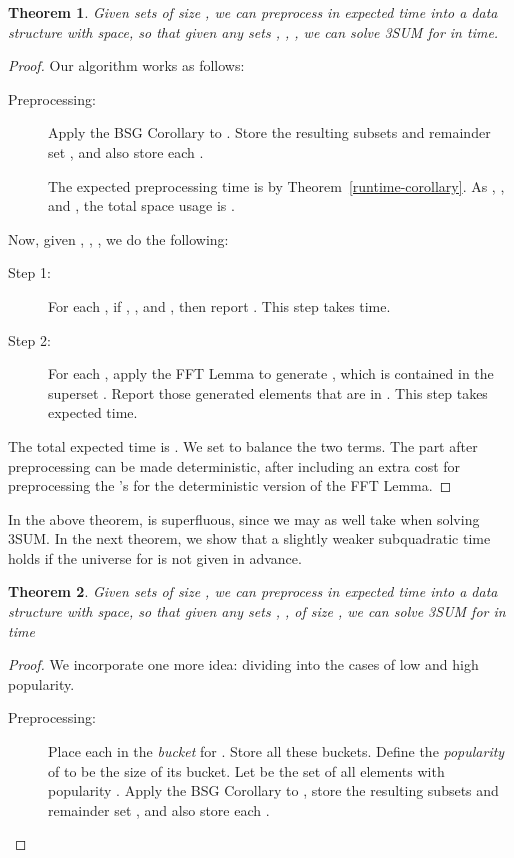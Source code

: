 \documentclass[11pt]{article}
\newtheorem{theorem}{Theorem}[section]
\begin{document}
{\begin{theorem}\label{thm-preproc1}
Given sets  of size , we can
preprocess in  expected time into a data structure
with  space, so that given any sets ,
, , we can solve 3SUM
for  in  time.
\end{theorem}
\begin{proof}
Our algorithm works as follows:
\begin{description}
\item[Preprocessing:] Apply the BSG
Corollary to .  Store the resulting subsets   and remainder set , and
also store each .

The expected preprocessing time is  by Theorem~\ref{runtime-corollary}.
As , , and ,
the total space usage is .
\end{description}

Now, given , , ,
we do the following:
\begin{description}
\item[Step 1:] For each , if , , and
, then report .
This step takes  time.

\item[Step 2:] For each , apply the FFT Lemma to generate
, which is contained in the superset .  Report those generated elements that are in .
This step takes  expected time.
\end{description}

The total expected time
is .  We set 
to balance the two terms.
The part after preprocessing can be made deterministic,
after including
an extra  cost for preprocessing
the 's for the deterministic version of the FFT Lemma.
\end{proof}

In the above theorem,  is superfluous, since
we may as well take  when solving 3SUM.  In the
next theorem, we show that a slightly weaker
subquadratic time holds if the universe for  is not given in advance.

\begin{theorem}\label{thm-preproc2}
Given sets  of size , we can
preprocess in  expected time into a data structure
with  space, so that given any sets ,
,  of size , we can solve 3SUM
for  in  time
\end{theorem}
\begin{proof}
We incorporate one more idea: dividing into the cases of
low and high popularity.

\begin{description}
\item[Preprocessing:]
Place each  in the \emph{bucket} for
.  Store all these buckets.
Define the \emph{popularity}
of  to be the size of its bucket.
Let  be the set of all
elements  with popularity .  Apply the BSG
Corollary to , store the resulting subsets  and remainder set , and
also store each .


\end{description}
\end{proof}}
\end{document}
